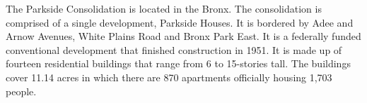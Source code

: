   

   

The Parkside Consolidation is located in the Bronx. The consolidation is comprised of a single development, Parkside Houses. It is bordered by Adee and Arnow Avenues, White Plains Road and Bronx Park East. It is a federally funded conventional development that finished construction in 1951. It is made up of fourteen residential buildings that range from 6 to 15-stories tall. The buildings cover 11.14 acres in which there are 870 apartments officially housing 1,703 people.    